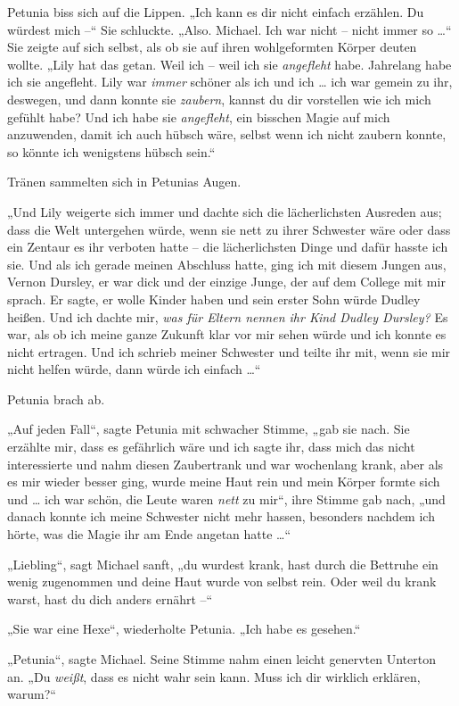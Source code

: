 {Petunia biss sich auf die Lippen. „Ich kann es dir nicht einfach erzählen. Du würdest mich --“ Sie schluckte. „Also. Michael. Ich war nicht -- nicht immer so …“ Sie zeigte auf sich selbst, als ob sie auf ihren wohlgeformten Körper deuten wollte. „Lily hat das getan. Weil ich -- weil ich sie \emph{angefleht} habe. Jahrelang habe ich sie angefleht. Lily war \emph{immer} schöner als ich und ich … ich war gemein zu ihr, deswegen, und dann konnte sie \emph{zaubern}, kannst du dir vorstellen wie ich mich gefühlt habe? Und ich habe sie \emph{angefleht}, ein bisschen Magie auf mich anzuwenden, damit ich auch hübsch wäre, selbst wenn ich nicht zaubern konnte, so könnte ich wenigstens hübsch sein.“

Tränen sammelten sich in Petunias Augen.

„Und Lily weigerte sich immer und dachte sich die lächerlichsten Ausreden aus; dass die Welt untergehen würde, wenn sie nett zu ihrer Schwester wäre oder dass ein Zentaur es ihr verboten hatte -- die lächerlichsten Dinge und dafür hasste ich sie. Und als ich gerade meinen Abschluss hatte, ging ich mit diesem Jungen aus, Vernon Dursley, er war dick und der einzige Junge, der auf dem College mit mir sprach. Er sagte, er wolle Kinder haben und sein erster Sohn würde Dudley heißen. Und ich dachte mir, \emph{was für Eltern nennen ihr Kind Dudley Dursley?} Es war, als ob ich meine ganze Zukunft klar vor mir sehen würde und ich konnte es nicht ertragen. Und ich schrieb meiner Schwester und teilte ihr mit, wenn sie mir nicht helfen würde, dann würde ich einfach …“

Petunia brach ab.

„Auf jeden Fall“, sagte Petunia mit schwacher Stimme, „gab sie nach. Sie erzählte mir, dass es gefährlich wäre und ich sagte ihr, dass mich das nicht interessierte und nahm diesen Zaubertrank und war wochenlang krank, aber als es mir wieder besser ging, wurde meine Haut rein und mein Körper formte sich und … ich war schön, die Leute waren \emph{nett} zu mir“, ihre Stimme gab nach, „und danach konnte ich meine Schwester nicht mehr hassen, besonders nachdem ich hörte, was die Magie ihr am Ende angetan hatte …“

„Liebling“, sagt Michael sanft, „du wurdest krank, hast durch die Bettruhe ein wenig zugenommen und deine Haut wurde von selbst rein. Oder weil du krank warst, hast du dich anders ernährt --“

„Sie war eine Hexe“, wiederholte Petunia. „Ich habe es gesehen.“

„Petunia“, sagte Michael. Seine Stimme nahm einen leicht genervten Unterton an. „Du \emph{weißt}, dass es nicht wahr sein kann. Muss ich dir wirklich erklären, warum?“

}

